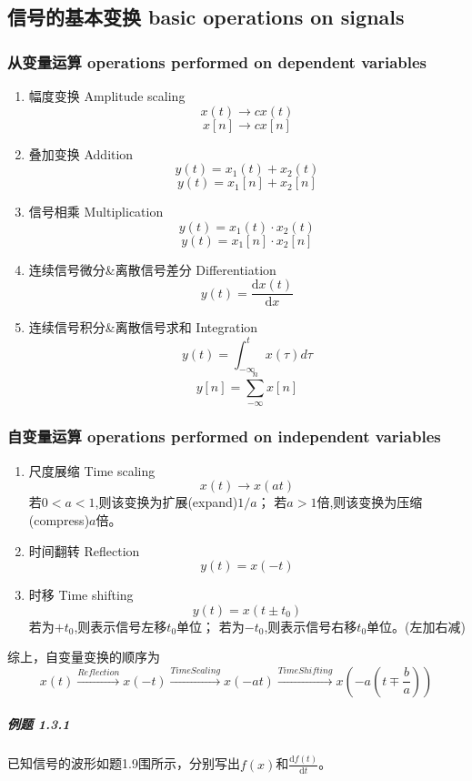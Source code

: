 \documentclass[UTF8]{article}
\begin{document}
\subsection{信号的基本变换 basic operations on signals}
\subsubsection{从变量运算 operations performed on dependent variables}
\begin{enumerate}
    \item 幅度变换 Amplitude scaling
        $$x(t)\rightarrow cx(t)$$
        $$x[n]\rightarrow cx[n]$$
    \item 叠加变换 Addition
        $$y(t)=x_{1}(t)+x_{2}(t)$$
        $$y(t)=x_{1}[n]+x_{2}[n]$$
    \item 信号相乘 Multiplication
        $$y(t)=x_{1}(t)\cdot x_{2}(t)$$
        $$y(t)=x_{1}[n]\cdot x_{2}[n]$$
    \item 连续信号微分\&离散信号差分 Differentiation
        $$y(t)=\frac{\mathrm{d} x(t)}{\mathrm{d} x}$$
    \item 连续信号积分\&离散信号求和 Integration
        $$y(t)=\int_{-\infty }^{t}x(\tau )d\tau$$
        $$y[n]=\sum_{-\infty}^{n} x[n]$$

\end{enumerate}
\subsubsection{自变量运算 operations performed on independent variables}
\begin{enumerate}
    \item 尺度展缩 Time scaling
        $$x(t)\rightarrow x(at)$$
        若$0<a<1$,则该变换为扩展(expand)$1/a$；
        若$a>1$倍,则该变换为压缩(compress)$a$倍。
    \item 时间翻转 Reflection
        $$y(t)=x(-t)$$
    \item 时移 Time shifting
        $$y(t)=x(t\pm t_{0})$$
        若为$+t_{0}$,则表示信号左移$t_{0}$单位；
        若为$-t_{0}$,则表示信号右移$t_{0}$单位。(左加右减)
\end{enumerate}
综上，自变量变换的顺序为
$$x(t) \overset{Reflection}{\rightarrow} x(-t) \overset{Time Scaling}{\rightarrow} x(-at) \overset{Time Shifting}{\rightarrow} x(-a(t\mp \frac{b}{a}))$$

\subparagraph{例题 1.3.1}

    已知信号的波形如题1.9围所示，分别写出$f(x)$和$\frac{\mathrm{d} f(t)}{\mathrm{d} t}$。
\end{document}

